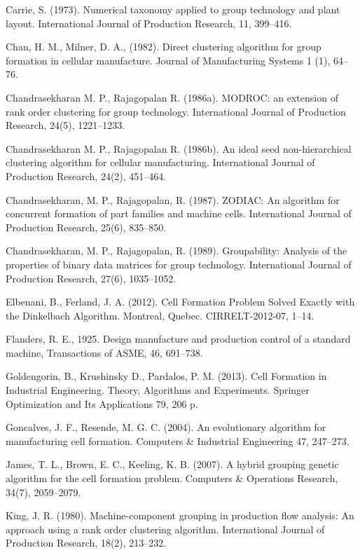 \documentclass[citeauthoryear]{llncs}
\begin{document}
\begin{thebibliography}{99}
 Carrie, S. (1973). Numerical taxonomy applied to group technology and plant layout. International Journal of Production Research, 11, 399--416.

 Chan, H. M., Milner, D. A., (1982). Direct clustering algorithm for group formation in cellular manufacture. Journal of Manufacturing Systems 1 (1), 64--76.

 Chandrasekharan M. P., Rajagopalan R. (1986a). MODROC: an extension of rank order clustering for group technology. International Journal of Production Research, 24(5), 1221--1233.

 Chandrasekharan M. P., Rajagopalan R. (1986b). An ideal seed non-hierarchical clustering algorithm for cellular manufacturing. International Journal of Production Research, 24(2), 451--464.

 Chandrasekharan, M. P., Rajagopalan, R. (1987). ZODIAC: An algorithm for concurrent formation of part families and machine cells. International Journal of Production Research, 25(6), 835--850.

 Chandrasekharan, M. P., Rajagopalan, R. (1989). Groupability: Analysis of the properties of binary data matrices for group technology. International Journal of Production Research, 27(6), 1035--1052.

 Elbenani, B., Ferland, J. A. (2012). Cell Formation Problem Solved Exactly with the Dinkelbach Algorithm. Montreal, Quebec. CIRRELT-2012-07, 1--14.

 Flanders, R. E., 1925. Design manufacture and production control of a standard machine, Transactions of ASME, 46, 691--738.

 Goldengorin, B., Krushinsky D., Pardalos, P. M. (2013). Cell Formation in Industrial Engineering. Theory, Algorithms and Experiments. Springer Optimization and Its Applications 79, 206 p.

 Goncalves, J. F., Resende, M. G. C. (2004). An evolutionary algorithm for manufacturing cell formation. Computers \& Industrial Engineering 47, 247--273.

 James, T. L., Brown, E. C., Keeling, K. B. (2007). A hybrid grouping genetic algorithm for the cell formation problem. Computers \& Operations Research, 34(7), 2059--2079.

 King, J. R. (1980). Machine-component grouping in production flow analysis: An approach using a rank order clustering algorithm. International Journal of Production Research, 18(2), 213--232.


\end{thebibliography}
\end{document}
